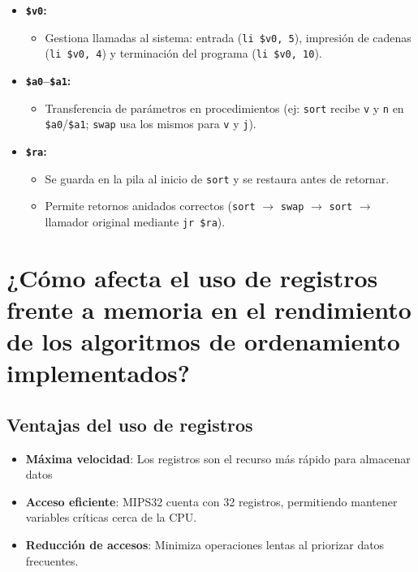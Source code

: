 \documentclass{article}
\begin{document}
\begin{itemize}
    \item \textbf{\texttt{\$v0}:} 
    \begin{itemize}
        \item Gestiona llamadas al sistema: entrada (\texttt{li \$v0, 5}), impresión de cadenas (\texttt{li \$v0, 4}) y terminación del programa (\texttt{li \$v0, 10}).
    \end{itemize}
    
    \item \textbf{\texttt{\$a0}--\texttt{\$a1}:} 
    \begin{itemize}
        \item Transferencia de parámetros en procedimientos (ej: \texttt{sort} recibe \texttt{v} y \texttt{n} en \texttt{\$a0}/\texttt{\$a1}; \texttt{swap} usa los mismos para \texttt{v} y \texttt{j}).
    \end{itemize}
    
    \item \textbf{\texttt{\$ra}:} 
    \begin{itemize}
        \item Se guarda en la pila al inicio de \texttt{sort} y se restaura antes de retornar.
        \item Permite retornos anidados correctos (\texttt{sort} $\rightarrow$ \texttt{swap} $\rightarrow$ \texttt{sort} $\rightarrow$ llamador original mediante \texttt{jr \$ra}).
    \end{itemize}
\end{itemize}

\section{¿Cómo afecta el uso de registros frente a memoria en el rendimiento de los algoritmos de ordenamiento implementados?}

\subsection*{Ventajas del uso de registros}
\begin{itemize}
    \item \textbf{Máxima velocidad}: Los registros son el recurso más rápido para almacenar datos
    \item \textbf{Acceso eficiente}: MIPS32 cuenta con 32 registros, permitiendo mantener variables críticas cerca de la CPU.
    \item \textbf{Reducción de accesos}: Minimiza operaciones lentas al priorizar datos frecuentes.
\end{itemize}
\end{document}
